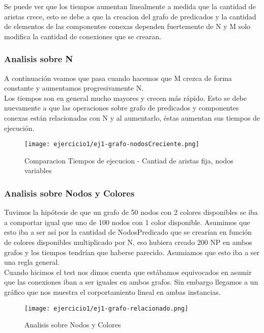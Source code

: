 Se puede ver que los tiempos aumentan linealmente a medida que la cantidad de aristas crece, esto se debe a que la creacion del grafo de predicados y la cantidad de elementos de las componentes conexas dependen fuertemente de N y M solo modifica la cantidad de conexiones que se crearan. \\

\pagebreak
\subsubsection{Analisis sobre N}

A continuaci\'on veamos que pasa cuando hacemos que M crezca de forma constante y aumentamos progresivamente N.\\
Los tiempos son en general mucho mayores y crecen m\'as r\'apido. Esto se debe nuevamente a que las operaciones sobre grafo de predicados y componentes conexas est\'an relacionadas con N y al aumentarlo, \'estas aumentan sus tiempos de ejecuci\'on. 

\begin{figure}[h!]
\texttt{[image: ejercicio1/ej1-grafo-nodosCreciente.png]}
\centering
\caption{Comparacion Tiempos de ejecucion - Cantiad de aristas fija, nodos variables}
\label{overflow3}
\end{figure}

\pagebreak
\subsubsection{Analisis sobre Nodos y Colores}

Tuvimos la hip\'otesis de que un grafo de 50 nodos con 2 colores disponibles se iba a comportar igual que uno de 100 nodos con 1 color disponible. Asumimos que esto iba a ser as\'i por la cantidad de NodosPredicado que se crear\'ian en funci\'on de colores disponibles multiplicado por N, eso hubiera creado 200 NP en ambos grafos y los tiempos tendr\'ian que haberse parecido. Asumiamos que esto iba a ser una regla general.\\

Cuando hicimos el test nos dimos cuenta que est\'abamos equivocados en asumir que las conexiones iban a ser iguales en ambos grafos. Sin embargo llegamos a un gr\'afico que nos muestra el corportamiento lineal en ambas instancias.


\begin{figure}[h!]
\texttt{[image: ejercicio1/ej1-grafo-relacionado.png]}
\centering
\caption{Analisis sobre Nodos y Colores}
\label{overflow3}
\end{figure}

